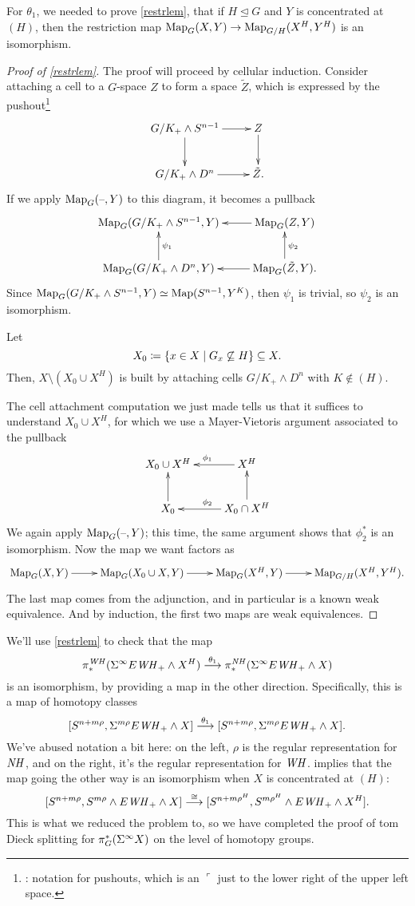 For $\theta_1$, we needed to prove \cref{restrlem}, that if $H\trianglelefteq G$ and $Y$ is concentrated at $(H)$,
then the restriction map $\operatorname{Map}_G(X,Y)\to\operatorname{Map}_{G/H}(X^H,Y^H)$ is an isomorphism.
\begin{proof}[Proof of \cref{restrlem}]
The proof will proceed by cellular induction. Consider attaching a cell to a $G$-space $Z$ to form a space
$\tilde Z$, which is expressed by the pushout\footnote{\TODO: notation for pushouts, which is an $\ulcorner$
just to the lower right of the upper left space.}
\[\xymatrix{
	G/K_+\wedge S^{n-1}\ar[r]\ar[d] & Z\ar[d]\\
	G/K_+\wedge D^n\ar[r] & \tilde Z.
}\]
If we apply $\operatorname{Map}_G(\text{--},Y)$ to this diagram, it becomes a pullback
\[\xymatrix{
	\Map_G(G/K_+\wedge S^{n-1}, Y) & \Map_G(Z,Y)\ar[l]\\
	\Map_G(G/K_+\wedge D^n, Y)\ar[u]_{\psi_1} & \Map_G(\tilde Z,Y)\ar[l]\ar[u]_{\psi_2}.
}\]
Since $\operatorname{Map}_G(G/K_+\wedge S^{n-1}, Y)\simeq \operatorname{Map}(S^{n-1}, Y^K)$, then $\psi_1$ is trivial, so $\psi_2$ is an
isomorphism.

Let
\[X_0\coloneqq\{x\in X\mid G_x\not\subseteq H\}\subseteq X.\]
Then, $X\setminus (X_0\cup X^H)$ is built by attaching cells $G/K_+\wedge D^n$ with $K\not\in (H)$.

The cell attachment computation we just made tells us that it suffices to understand $X_0\cup X^H$, for which we
use a Mayer-Vietoris argument associated to the pullback
\[\xymatrix{
	X_0\cup X^H & X^H\ar[l]_{\phi_1}\\
	X_0\ar[u] & X_0\cap X^H\ar[l]_{\phi_2}\ar[u].
}\]
We again apply $\operatorname{Map}_G(\text{--},Y)$; this time, the same argument shows that $\phi_2^*$ is an isomorphism. Now the map
we want factors as
\[\xymatrix{
	\Map_G(X,Y)\ar[r] & \Map_G(X_0\cup X, Y)\ar[r] & \Map_G(X^H,Y)\ar[r] & \Map_{G/H}(X^H,Y^H).
}\]
The last map comes from the adjunction, and in particular is a known weak equivalence. And by induction, the first
two maps are weak equivalences.
\end{proof}
We'll use \cref{restrlem} to check that the map
\[\pi_*^{\mathit{WH}}(\Sigma^\infty E\mathit{WH}_+\wedge X^H)\stackrel{\theta_1}{\longrightarrow} \pi_*^{\mathit{NH}}(\Sigma^\infty E\mathit{WH}_+\wedge X)\]
is an isomorphism, by providing a map in the other direction. Specifically, this is a map of homotopy classes
\[[S^{n+m\rho}, \Sigma^{m\rho} E\mathit{WH}_+\wedge X]\stackrel{\theta_1}{\longrightarrow} [S^{n+m\rho}, \Sigma^{m\rho}
E\mathit{WH}_+\wedge X].\]
We've abused notation a bit here: on the left, $\rho$ is the regular representation for $\mathit{NH}$, and on the right,
it's the regular representation for $\mathit{WH}$.  implies that the map going the other way is an
isomorphism when $X$ is concentrated at $(H)$:
\[[S^{n+m\rho}, S^{m\rho}\wedge E\mathit{WH}_+\wedge X]\stackrel\cong\longrightarrow [S^{n + m\rho^H}, S^{m\rho^H}\wedge
E\mathit{WH}_+\wedge X^H].\]
This is what we reduced the problem to, so we have completed the proof of tom Dieck splitting for $\pi_G^*(\Sigma^\infty X)$
on the level of homotopy groups.
